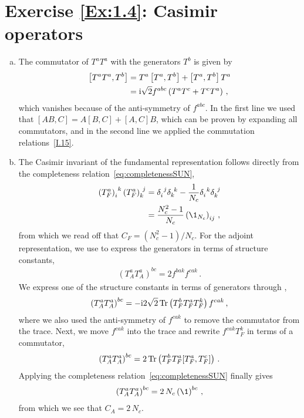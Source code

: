 
\section*{Exercise \ref{Ex:1.4}: Casimir operators}
\label{Sol:1.4}

\begin{enumerate}[a)]

\item The commutator of $T^a T^a$ with the generators $T^b$ is given by
\begin{align}
\begin{aligned}
\left[ T^a T^a, T^b \right] & = T^a  \left[ T^a, T^b \right] + \left[ T^a, T^b \right] T^a \\
& = \mathrm{i} \sqrt{2} f^{abc} \left( T^{a} T^{c} + T^{c} T^{a} \right) \,,
\end{aligned}
\end{align}
which vanishes because of the anti-symmetry of $f^{abc}$. In the first line we used that $[A B,C] = A [B,C] + [A,C] B$, which can be proven by expanding all commutators, and in the second line we applied the commutation relations~\eqref{I.15}.

\smallskip
\item The Casimir invariant of the fundamental representation follows directly from the completeness relation~\eqref{eq:completenessSUN}, 
\begin{align}
\begin{aligned}
\left(T^a_F \right)_{i}^{\ k} \left(T^a_F \right)_{k}^{\ j} & = \delta_{i}^{\ j} \delta_{k}^{\ k} - \frac{1}{N_c} \delta_{i}^{\ k} \delta_{k}^{\ j} \\
& = \frac{N_c^2-1}{N_c} \left( \1_{N_c} \right)_{ij} \,,
\end{aligned}
\end{align}
from which we read off that $C_F = (N_c^2-1)/N_c$. For the adjoint representation, we use  to express the generators in terms of structure constants,
\begin{align}
\left(T^a_A T^a_A \right)^{bc} = 2 f^{bak} f^{cak} \,.
\end{align}
We express one of the structure constants in terms of generators through ,
\begin{align}
\left(T^a_A T^a_A \right)^{bc} = - \mathrm{i} 2 \sqrt{2} \mathop{\mathrm{Tr}}\left(T^b_F T^a_F T^k_F \right) f^{cak} \,,
\end{align}
where we also used the anti-symmetry of $f^{cak}$ to remove the commutator from the trace. Next, we move $f^{cak}$ into the trace and rewrite $ f^{cak} T^k_F $ in terms of a commutator,
\begin{align}
\left(T^a_A T^a_A\right)^{bc} = 2 \mathop{\mathrm{Tr}} \left( T^b_F T^a_F [T^a_F, T^c_F] \right) \,.
\end{align}
Applying the completeness relation~\eqref{eq:completenessSUN} finally gives
\begin{align}
\left(T^a_A T^a_A\right)^{bc} = 2 \, N_c \left( \1\right)^{bc} \,,
\end{align}
from which we see that $C_A = 2 \, N_c$. \\


\end{enumerate}
